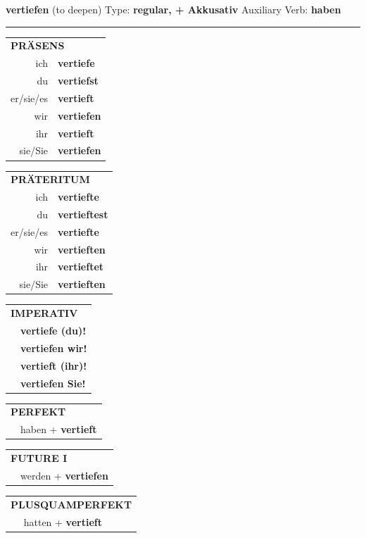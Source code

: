 \documentclass[10pt,a4paper]{revtex4-2}
\begin{document}
\begin{verbbox-acc}
{\Large \bf vertiefen} (to deepen) \hfill Type: \textbf{regular, + Akkusativ} \hfill Auxiliary Verb: \textbf{haben}

\vspace{5pt}
\hrule
\vspace{5pt}

\begin{tabular}{rl}
\multicolumn{2}{l}{\textbf{PRÄSENS}}\\
ich & \textbf{vertiefe}\\
du & \textbf{vertiefst}\\
er/sie/es & \textbf{vertieft}\\
wir & \textbf{vertiefen}\\
ihr & \textbf{vertieft}\\
sie/Sie & \textbf{vertiefen}\\
\end{tabular}
\hfill
\begin{tabular}{rl}
\multicolumn{2}{l}{\textbf{PRÄTERITUM}}\\
ich & \textbf{vertiefte}\\
du & \textbf{vertieftest}\\
er/sie/es & \textbf{vertiefte}\\
wir & \textbf{vertieften}\\
ihr & \textbf{vertieftet}\\
sie/Sie & \textbf{vertieften}\\
\end{tabular}
\hfill
\begin{tabular}{rl}
\multicolumn{2}{l}{\textbf{IMPERATIV}}\\
& \textbf{vertiefe (du)!}\\
& \textbf{vertiefen wir!}\\
& \textbf{vertieft (ihr)!}\\
& \textbf{vertiefen Sie!}\\
\end{tabular}

\vspace{10pt}

\begin{tabular}{rl}
\multicolumn{2}{l}{\textbf{PERFEKT}}\\
& haben + \textbf{vertieft}\\
\end{tabular}
\hfill
\begin{tabular}{rl}
\multicolumn{2}{l}{\textbf{FUTURE I}}\\
& werden + \textbf{vertiefen}\\
\end{tabular}
\hfill
\begin{tabular}{rl}
\multicolumn{2}{l}{\textbf{PLUSQUAMPERFEKT}}\\
& hatten + \textbf{vertieft}\\
\end{tabular}


\end{verbbox-acc}
\end{document}
